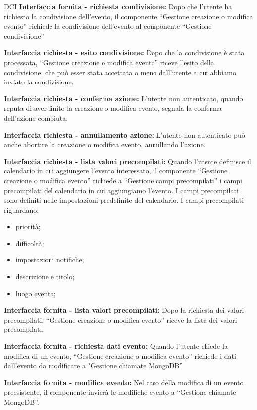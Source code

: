 \begin{listaPersonale}{DCI}
    \textbf{Interfaccia fornita - richiesta condivisione:} Dopo che l'utente ha richiesto la condivisione dell'evento, il componente “Gestione creazione o modifica evento” richiede la condivisione dell'evento al componente “Gestione condivisione”

    \textbf{Interfaccia richiesta - esito condivisione:} Dopo che la condivisione è stata processata, “Gestione creazione o modifica evento” riceve l'esito della condivisione, che può esser stata accettata o meno dall'utente a cui abbiamo inviato la condivisione.

    \textbf{Interfaccia richiesta - conferma azione:} L'utente non autenticato, quando reputa di aver finito la creazione o modifica evento, segnala la conferma dell'azione compiuta.

    \textbf{Interfaccia richiesta - annullamento azione:} L'utente non autenticato può anche abortire la creazione o modifica evento, annullando l'azione.

    \textbf{Interfaccia richiesta - lista valori precompilati:} Quando l'utente definisce il calendario in cui aggiungere l'evento interessato, il componente “Gestione creazione o modifica evento” richiede a “Gestione campi precompilati” i campi precompilati del calendario in cui aggiungiamo l'evento. I campi precompilati sono definiti nelle impostazioni predefinite del calendario.
    I campi precompilati riguardano:
    \begin{itemize}
        \item priorità;
        \item difficoltà;
        \item impostazioni notifiche;
        \item descrizione e titolo;
        \item luogo evento;
    \end{itemize}

    \textbf{Interfaccia fornita - lista valori precompilati:}  Dopo la richiesta dei valori precompilati, “Gestione creazione o modifica evento” riceve la lista dei valori precompilati.

    \textbf{Interfaccia fornita - richiesta dati evento:} Quando l'utente chiede la modifica di un evento, “Gestione creazione o modifica evento” richiede i dati dall'evento da modificare a "Gestione chiamate MongoDB”

    \textbf{Interfaccia fornita - modifica evento:} Nel caso della modifica di un evento preesistente, il componente invierà le modifiche evento a “Gestione chiamate MongoDB”.


\end{listaPersonale}
